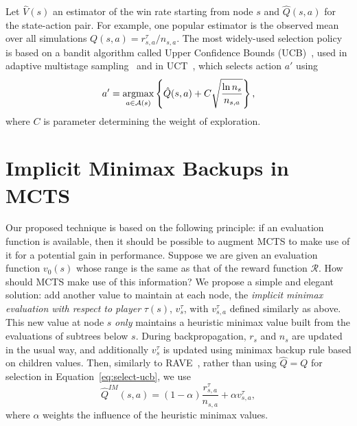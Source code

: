 \documentclass{article}
\newcommand{\argmax}{\operatornamewithlimits{argmax}}
\newcommand{\cA}{\mathcal{A}}
\newcommand{\cR}{\mathcal{R}}
\newcommand{\hQ}{\hat{Q}}
\newcommand{\hV}{\hat{V}}
\begin{document}
Let $\hV(s)$ an estimator of the win rate starting from node $s$ and $\hQ(s,a)$ for the state-action pair. 
For example, one popular estimator is the observed mean over all simulations 
$Q(s,a) = r^{\tau}_{s,a} / n_{s,a}$. 
The most widely-used selection policy is based on a bandit algorithm called Upper Confidence Bounds 
(UCB)~\cite{Auer02Finite}, used in adaptive multistage sampling~\cite{Chang2005AMS} and in 
UCT~\cite{Kocsis06Bandit}, which selects action $a'$ using
\begin{equation}
\label{eq:select-ucb}
a' = \argmax_{a \in \cA(s)} \left\{ \hQ(s,a) + C \sqrt{\frac{\ln n_s}{n_{s,a}}} \right\}, 
\end{equation}
where $C$ is parameter determining the weight of exploration. 

\section{Implicit Minimax Backups in MCTS}

Our proposed technique is based on the following principle: if an evaluation function is available, then it should 
be possible to augment MCTS to make use of it for a potential gain in performance.  
Suppose we are given an evaluation function $v_0(s)$ whose range is the same as that of the reward function $\cR$. 
How should MCTS make use of this information? 
We propose a simple and elegant solution: add another value to maintain at each node, the 
{\it implicit minimax evaluation with respect to player} $\tau(s)$, $v^{\tau}_s$, with $v^{\tau}_{s,a}$ defined similarly 
as above. 
This new value at node $s$ {\it only} maintains a heuristic minimax value built from the evaluations of subtrees below $s$. 
During backpropagation, $r_s$ and $n_s$ are updated in the usual way, and additionally $v^{\tau}_s$ is updated using minimax backup 
rule based on children values. Then, similarly to RAVE~\cite{Gelly07Combining}, rather than using $\hQ = Q$ for 
selection in Equation~\ref{eq:select-ucb}, we use
\begin{equation}
\label{eq:imq}
\hQ^{\mathit{IM}}(s,a) = (1-\alpha) \frac{r^{\tau}_{s,a}}{n_{s,a}} + \alpha v^{\tau}_{s,a}, 
\end{equation}
where $\alpha$ weights the influence of the heuristic minimax values.
\end{document}
